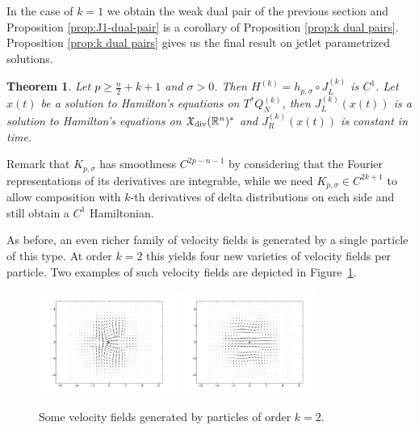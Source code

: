 \documentclass[12pt]{amsart}
\newcommand{\R}{\ensuremath{\mathbb{R}}}
\newtheorem{thm}{Theorem}[section]
\begin{document}
  In the case of $k=1$ we obtain the weak dual pair of the previous section and Proposition \ref{prop:J1-dual-pair} is a corollary of Proposition \ref{prop:k dual pairs}.
  Proposition \ref{prop:k dual pairs} gives us the final result on
  jetlet parametrized solutions.
  \begin{thm}\label{thm:k-solutions}
    Let $p \ge \frac{n}{2} + k + 1$ and $\sigma > 0$.
    Then $H^{(k)} = h_{p,\sigma} \circ J_L^{(k)}$ is $C^1$.
    Let $x(t)$ be a solution to Hamilton's equations on
    $T^*Q^{(k)}_N$, then $J_L^{(k)}( x(t))$ is a solution to Hamilton's
    equations on $\mathfrak{X}_{\rm div}(\R^n)^*$
    and $J_R^{(k)}( x(t))$ is constant in time.
  \end{thm}
  Remark that $K_{p,\sigma}$ has smoothness $C^{2p-n-1}$ by considering
  that the Fourier representations of its derivatives are integrable,
  while we need $K_{p,\sigma} \in C^{2k+1}$ to allow composition with
  $k$-th derivatives of delta distributions on each side and still
  obtain a $C^1$ Hamiltonian.

  As before, an even richer family of velocity fields is generated by a single particle of this type.
  At order $k=2$ this yields four new varieties of velocity fields per particle.
  Two examples of such velocity fields are depicted in Figure~\ref{fig:2_jet}.
  
  \begin{figure}[h!]
  	\centering
	\includegraphics[width=0.4\textwidth]{two_jet_a_2D.pdf}
	\includegraphics[width=0.4\textwidth]{two_jet_b_2D.pdf}
	\caption{Some velocity fields generated by particles of order $k=2$.}
	\label{fig:2_jet}
  \end{figure}
  
\end{document}
